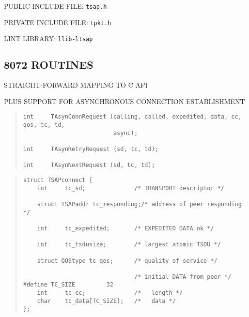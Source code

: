 \begin{bwslide}

\begin{nrtc}
\item	PUBLIC INCLUDE FILE: \verb"tsap.h"

\item	PRIVATE INCLUDE FILE: \verb"tpkt.h"

\item	LINT LIBRARY: \verb"llib-ltsap"
\end{nrtc}
\end{bwslide}


\begin{bwslide}
\part*	{8072 ROUTINES}\bf

\begin{nrtc}
\item	STRAIGHT-FORWARD MAPPING TO C API

\item	PLUS SUPPORT FOR ASYNCHRONOUS CONNECTION ESTABLISHMENT
\end{nrtc}
\end{bwslide}


\begin{bwslide}

\begin{quote}\small\begin{verbatim}
int     TAsynConnRequest (calling, called, expedited, data, cc, qos, tc, td,
                          async);

int     TAsynRetryRequest (sd, tc, td);

int     TAsynNextRequest (sd, tc, td);
\end{verbatim}\end{quote}
\end{bwslide}


\begin{bwslide}

\begin{quote}\small\begin{verbatim}
struct TSAPconnect {
    int     tc_sd;              /* TRANSPORT descriptor */

    struct TSAPaddr tc_responding;/* address of peer responding */

    int     tc_expedited;       /* EXPEDITED DATA ok */

    int     tc_tsdusize;        /* largest atomic TSDU */

    struct QOStype tc_qos;      /* quality of service */

                                /* initial DATA from peer */
#define TC_SIZE         32
    int     tc_cc;              /*   length */
    char    tc_data[TC_SIZE];   /*   data */
};
\end{verbatim}\end{quote}
\end{bwslide}


